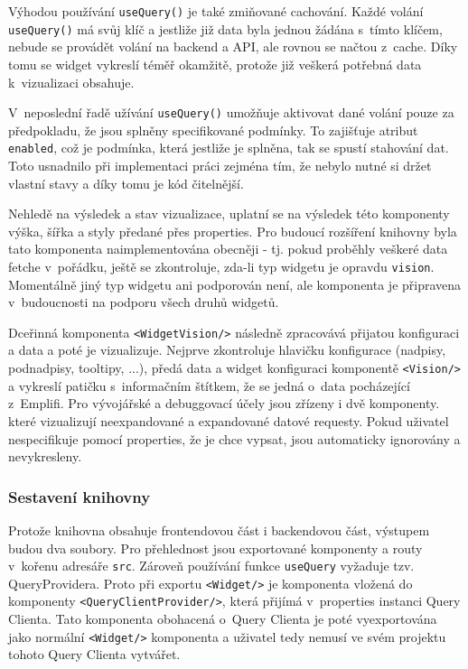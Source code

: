\documentclass[czech, bc, kiv, he, iso690numb]{fasthesis}
\begin{document}
Výhodou používání \texttt{useQuery()} je také zmiňované cachování. Každé volání \texttt{useQuery()} má svůj klíč a jestliže již data byla jednou žádána s~tímto klíčem,
nebude se provádět volání na backend a API, ale rovnou se načtou z~cache. Díky tomu se widget vykreslí téměř okamžitě, protože již veškerá potřebná data k~vizualizaci obsahuje. 

V~neposlední řadě užívání \texttt{useQuery()} umožňuje aktivovat dané volání pouze za předpokladu, že jsou splněny specifikované podmínky. To zajišťuje atribut \texttt{enabled},
což je podmínka, která jestliže je splněna, tak se spustí stahování dat. Toto usnadnilo při implementaci práci zejména tím, že nebylo nutné si držet vlastní stavy a díky tomu
je kód čitelnější.

Nehledě na výsledek a stav vizualizace, uplatní se na výsledek této komponenty výška, šířka a styly předané přes properties. Pro budoucí rozšíření knihovny byla tato komponenta
naimplementována obecněji - tj. pokud proběhly veškeré data fetche v~pořádku, ještě se zkontroluje, zda-li typ widgetu je opravdu \texttt{vision}. Momentálně jiný typ widgetu ani podporován není,
ale komponenta je připravena v~budoucnosti na podporu všech druhů widgetů.


Dceřinná komponenta \texttt{<WidgetVision/>} následně zpracovává přijatou konfiguraci a data a poté je vizualizuje. Nejprve zkontroluje hlavičku konfigurace (nadpisy, podnadpisy, tooltipy, ...),
předá data a widget konfiguraci komponentě \texttt{<Vision/>} a vykreslí patičku s~informačním štítkem, že se jedná o~data pocházející z~Emplifi. Pro vývojářské a debuggovací účely jsou 
zřízeny i dvě komponenty. které vizualizují neexpandované a expandované datové requesty. Pokud uživatel nespecifikuje pomocí properties, že je chce vypsat, jsou automaticky ignorovány a nevykresleny.

\subsubsection{Sestavení knihovny}

Protože knihovna obsahuje frontendovou část i backendovou část, výstupem budou dva soubory. Pro přehlednost jsou exportované komponenty a routy v~kořenu adresáře \texttt{src}. Zároveň používání
funkce \texttt{useQuery} vyžaduje tzv. QueryProvidera. Proto při exportu \texttt{<Widget/>} je komponenta vložená do komponenty \texttt{<QueryClientProvider/>}, která přijímá v~properties instanci
Query Clienta. Tato komponenta obohacená o~Query Clienta je poté vyexportována jako normální \texttt{<Widget/>} komponenta a uživatel tedy nemusí ve svém projektu tohoto Query Clienta vytvářet.
\end{document}

